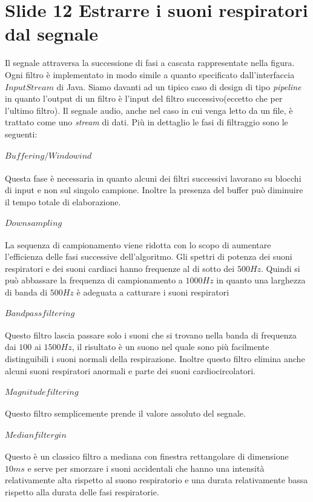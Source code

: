 \section{Slide 12 Estrarre i suoni respiratori dal segnale}
	Il segnale attraversa la successione di fasi a cascata rappresentate nella figura. 
	Ogni filtro \`e implementato in modo simile a quanto specificato dall'interfaccia $InputStream$ di Java. 
	Siamo davanti ad un tipico caso di design di tipo \emph{pipeline} in quanto l'output di un filtro \`e l'input del filtro successivo(eccetto che per l'ultimo filtro). 
	Il segnale audio, anche nel caso in cui venga letto da un file, \`e trattato come uno \emph{stream} di dati. 
	Pi\`u in dettaglio le fasi di filtraggio sono le seguenti:
      \paragraph{$Buffering/Windowind$}
	Questa fase \`e necessaria in quanto alcuni dei filtri successivi lavorano su blocchi di input e non sul singolo campione. 
	Inoltre la presenza del buffer pu\`o diminuire il tempo totale di elaborazione.
      \paragraph{$Downsampling$}
	La sequenza di campionamento viene ridotta con lo scopo di aumentare l'efficienza delle fasi successive dell'algoritmo. 
	Gli spettri di potenza dei suoni respiratori e dei suoni cardiaci hanno frequenze al di sotto dei $500Hz$. 
	Quindi si pu\`o abbassare la frequenza di campionamento a $1000Hz$ in quanto una larghezza di banda di $500Hz$ \`e adeguata a catturare i suoni respiratori
      \paragraph{$Bandpass filtering$}
	Questo filtro lascia passare solo i suoni che si trovano nella banda di frequenza dai $100$ ai $1500Hz$, il risultato \`e un suono nel quale sono pi\`u facilmente distinguibili i suoni normali della respirazione. 
	Inoltre questo filtro elimina anche alcuni suoni respiratori anormali e parte dei suoni cardiocircolatori.
      \paragraph{$Magnitude filtering$}
	Questo filtro semplicemente prende il valore assoluto del segnale.
      \paragraph{$Median filtergin$}
	Questo \`e un classico filtro a mediana con finestra rettangolare di dimensione $10ms$ e serve per smorzare i suoni accidentali che hanno una intensit\`a relativamente alta rispetto al suono respiratorio e una durata relativamente bassa rispetto alla durata delle fasi respiratorie.
